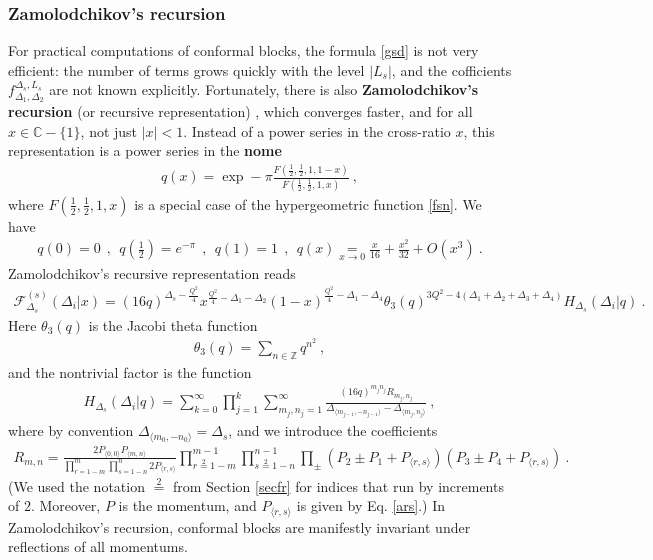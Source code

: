 \documentclass[12pt, a4paper, notitlepage, twoside]{report}
\numberwithin{equation}{section}
\theoremstyle{break}
\begin{document}
\subsubsection{Zamolodchikov's recursion}

For practical computations of conformal blocks, the formula \eqref{gsd} is not very efficient: the number of terms grows quickly with the level $|L_s|$, and the cofficients $f_{\Delta_1,\Delta_2}^{\Delta_s,L_s}$ are not known explicitly.
Fortunately, there is also
\textbf{Zamolodchikov's recursion} (or recursive representation) \cite{zz90, ccy17}, which converges faster, and for all $x\in\mathbb{C}-\{1\}$, not just $|x|<1$.
Instead of a power series in the cross-ratio $x$, this representation is a power series in the \textbf{nome}
\begin{align}
 q(x) = \exp -\pi \frac{F(\frac12,\frac12,1,1-x)}{F(\frac12,\frac12,1,x)}  \ , 
\end{align}
where $F(\frac12,\frac12,1,x)$ is a special case of the hypergeometric function \eqref{fsn}. 
We have 
\begin{align}
 q(0)=0 \ \ , \ \ q(\tfrac12) = e^{-\pi} \ \ , \ \ q(1)=1 \ \ , \ \ q(x)\underset{x\to 0}{=} \frac{x}{16}+\frac{x^2}{32} +O(x^3)\ .
\end{align}
Zamolodchikov's recursive representation reads 
\begin{align}
 \mathcal{F}^{(s)}_{\Delta_s}(\Delta_i|x) 
=  (16q)^{\Delta_s -\frac{Q^2}{4}} x^{\frac{Q^2}{4}-\Delta_1-\Delta_2} (1-x)^{\frac{Q^2}{4}-\Delta_1-\Delta_4} \theta_3(q)^{3Q^2-4(\Delta_1+\Delta_2+\Delta_3+\Delta_4)} H_{\Delta_s}(\Delta_i|q)\ .
\end{align}
Here $\theta_3(q)$ is the Jacobi theta function
\begin{align}
 \theta_3(q) = \sum_{n\in{\mathbb{Z}}} q^{n^2}\ ,
\end{align}
 and the nontrivial factor is the function
\begin{align}
 H_{\Delta_s}(\Delta_i|q) = \sum_{k=0}^\infty \prod_{j=1}^k \sum_{m_j,n_j=1}^\infty \frac{(16q)^{m_jn_j}R_{m_j,n_j}}{\Delta_{\langle m_{j-1},-n_{j-1} \rangle}-\Delta_{\langle m_j,n_j\rangle}}\ ,
\label{hdq}
\end{align}
where by convention $\Delta_{\langle m_0,-n_0\rangle} = \Delta_s$, and we introduce the coefficients
\begin{align}
 R_{m,n} = \frac{2P_{\langle 0,0\rangle} P_{\langle m,n\rangle}}{\prod_{r=1-m}^m \prod_{s=1-n}^n 2P_{\langle r,s\rangle}}
\prod_{r\overset{2}{=}1-m}^{m-1} \prod_{s\overset{2}{=}1-n}^{n-1} \prod_\pm (P_2\pm P_1 + P_{\langle r,s\rangle}) (P_3\pm P_4 +P_{\langle r,s\rangle})\ .
\end{align}
(We used the notation $\overset{2}{=}$ from Section \ref{secfr} for indices that run by increments of $2$.
Moreover, $P$ is the momentum, and $P_{\langle r,s \rangle}$ is given by Eq. \eqref{ars}.) In Zamolodchikov's  recursion, conformal blocks are manifestly invariant under reflections of all momentums.
\end{document}
